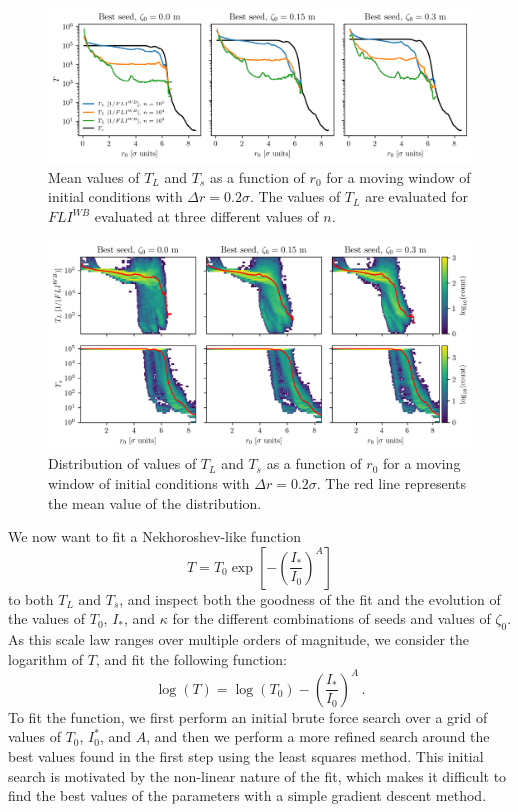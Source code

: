 \begin{figure}
    \centering
    \includegraphics[width=1\textwidth]{6_lhc_dynamic_indicators/figs/lyapunov_time_vs_radius.png}
    \caption{Mean values of $T_L$ and $T_s$ as a function of $r_0$ for a moving window of initial conditions with $\Delta r = 0.2\sigma$. The values of $T_L$ are evaluated for $FLI^{{WB}}$ evaluated at three different values of $n$.}
    \label{fig:ts_vs_tl}
\end{figure}

\begin{figure}
    \centering
    \includegraphics[width=1\textwidth]{6_lhc_dynamic_indicators/figs/dist_and_mean.png}
    \caption{Distribution of values of $T_L$ and $T_s$ as a function of $r_0$ for a moving window of initial conditions with $\Delta r = 0.2\sigma$. The red line represents the mean value of the distribution.}
    \label{fig:extra_distribution}
\end{figure}

We now want to fit a Nekhoroshev-like function
\begin{equation}
    T = T_0 \exp\left[-\left(\frac{I_\ast}{I_0}\right)^A\right]
\end{equation} 
to both $T_L$ and $T_s$, and inspect both the goodness of the fit and the evolution of the values of $T_0$, $I_\ast$, and $\kappa$ for the different combinations of seeds and values of $\zeta_0$. As this scale law ranges over multiple orders of magnitude, we consider the logarithm of $T$, and fit the following function:
\begin{equation}
    \log(T) = \log(T_0) - \left(\frac{I_\ast}{I_0}\right)^A \,.
\end{equation}
To fit the function, we first perform an initial brute force search over a grid of values of $T_0$, $I_0^*$, and $A$, and then we perform a more refined search around the best values found in the first step using the least squares method. This initial search is motivated by the non-linear nature of the fit, which makes it difficult to find the best values of the parameters with a simple gradient descent method.

